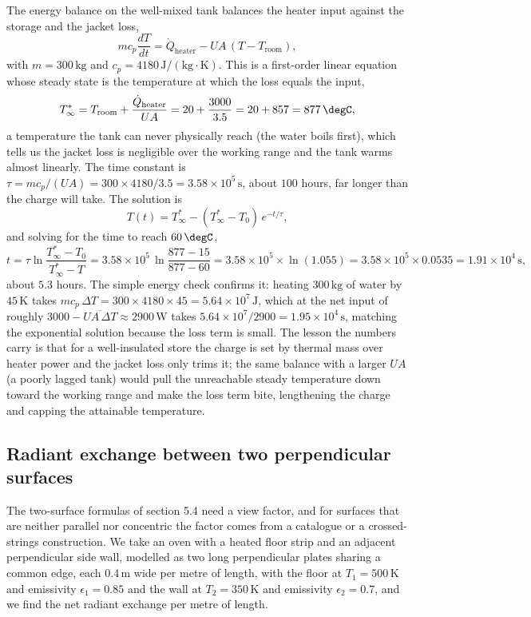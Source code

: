 The energy balance on the well-mixed tank balances the heater input against the
storage and the jacket loss,
\[
m c_p \frac{dT}{dt} = \dot{Q}_{\text{heater}} - UA\,(T - T_{\text{room}}),
\]
with $m = 300\,\text{kg}$ and $c_p = 4180\,\text{J}/(\text{kg}\cdot\si{
\kelvin})$. This is a first-order linear equation whose steady state is the
temperature at which the loss equals the input,
\[
T_\infty^* = T_{\text{room}} + \frac{\dot{Q}_{\text{heater}}}{UA} = 20 +
\frac{3000}{3.5} = 20 + 857 = 877\,\degC,
\]
a temperature the tank can never physically reach (the water boils first), which
tells us the jacket loss is negligible over the working range and the tank warms
almost linearly. The time constant is $\tau = m c_p/(UA) = 300 \times
4180/3.5 = 3.58\times10^{5}\,\text{s}$, about $100$ hours, far longer than the
charge will take. The solution is
\[
T(t) = T_\infty^* - (T_\infty^* - T_0)\,e^{-t/\tau},
\]
and solving for the time to reach $60\,\degC$,
\[
t = \tau\ln\!\frac{T_\infty^* - T_0}{T_\infty^* - T} = 3.58\times10^{5}\,
\ln\!\frac{877 - 15}{877 - 60} = 3.58\times10^{5}\times\ln(1.055) =
3.58\times10^{5}\times 0.0535 = 1.91\times10^{4}\,\text{s},
\]
about $5.3$ hours. The simple energy check confirms it: heating $300\,\text{kg}$
of water by $45\,\si{\kelvin}$ takes $m c_p\,\Delta T = 300\times4180\times45 =
5.64\times10^{7}\,\text{J}$, which at the net input of roughly $3000 -
\overline{UA\,\Delta T} \approx 2900\,\text{W}$ takes $5.64\times10^{7}/2900 =
1.95\times10^{4}\,\text{s}$, matching the exponential solution because the loss
term is small. The lesson the numbers carry is that for a well-insulated store
the charge is set by thermal mass over heater power and the jacket loss only
trims it; the same balance with a larger $UA$ (a poorly lagged tank) would pull
the unreachable steady temperature down toward the working range and make the
loss term bite, lengthening the charge and capping the attainable temperature.

\subsection{Radiant exchange between two perpendicular surfaces}

The two-surface formulas of section 5.4 need a view factor, and for surfaces
that are neither parallel nor concentric the factor comes from a catalogue or a
crossed-strings construction. We take an oven with a heated floor strip and an
adjacent perpendicular side wall, modelled as two long perpendicular plates
sharing a common edge, each $0.4\,\text{m}$ wide per metre of length, with the
floor at $T_1 = 500\,\si{\kelvin}$ and emissivity $\epsilon_1 = 0.85$ and the
wall at $T_2 = 350\,\si{\kelvin}$ and emissivity $\epsilon_2 = 0.7$, and we find
the net radiant exchange per metre of length.

